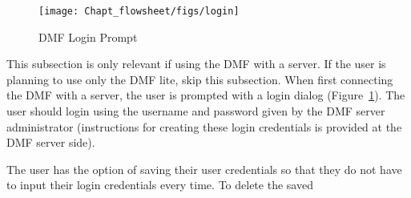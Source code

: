 \begin{figure}[H]
  \centering
  \texttt{[image: Chapt\_flowsheet/figs/login]}
  \caption{DMF Login Prompt}
  \label{fig:login-dialog}
\end{figure}

This subsection is only relevant if using the DMF with a server. If the user is
planning to use only the DMF lite, skip this subsection.
When first connecting the DMF with a server, the user is prompted with a login dialog (Figure~\ref{fig:login-dialog}).
The user should login using the username and password given by the DMF server administrator
(instructions for creating these login credentials is provided at the DMF server side).

The user has the option of saving their user credentials so that they do not have to input their login credentials every time. To delete the saved
